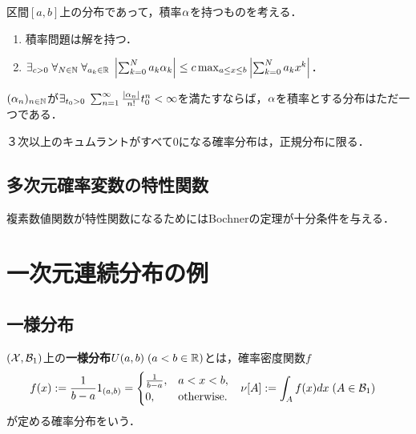 \documentclass[uplatex,dvipdfmx]{jsreport}
\begin{document}
\begin{theorem}[存在の必要十分条件]
    区間$[a,b]$上の分布であって，積率$\alpha$を持つものを考える．
    \begin{enumerate}
        \item 積率問題は解を持つ．
        \item $\exists_{c>0}\;\forall_{N\in\mathbb{N}}\;\forall_{a_k\in\mathbb{R}}\;\left|\sum^N_{k=0}a_k\alpha_k\right|\le c\max_{a\le x\le b}\left|\sum^N_{k=0}a_kx^k\right|$．
    \end{enumerate}
\end{theorem}

\begin{theorem}[一意性の十分条件]
    $(\alpha_n)_{n\in\mathbb{N}}$が$\exists_{t_0>0}\;\sum^\infty_{n=1}\frac{\lvert\alpha_n\rvert}{n!}t^n_0<\infty$を満たすならば，$\alpha$を積率とする分布はただ一つである．
\end{theorem}

\begin{example}
    ３次以上のキュムラントがすべて$0$になる確率分布は，正規分布に限る．
\end{example}

\subsection{多次元確率変数の特性関数}

\begin{tcolorbox}[colframe=ForestGreen, colback=ForestGreen!10!white,breakable,colbacktitle=ForestGreen!40!white,coltitle=black,fonttitle=\bfseries\sffamily,
title=]
    複素数値関数が特性関数になるためにはBochnerの定理が十分条件を与える．
\end{tcolorbox}

\section{一次元連続分布の例}

\subsection{一様分布}

\begin{definition}
    $(\mathcal{X},\mathcal{B}_1)$上の\textbf{一様分布}$U(a,b)\;(a<b\in\mathbb{R})$とは，確率密度関数$f$
    \begin{align*}
        f(x)&:=\frac{1}{b-a}1_{(a,b)}=\begin{cases}
            \frac{1}{b-a},&a<x<b,\\
            0,&\mathrm{otherwise}.
        \end{cases}&\nu[A]&:=\int_Af(x)dx\;(A\in\mathcal{B}_1)
    \end{align*}
    が定める確率分布をいう．
\end{definition}
\end{document}
